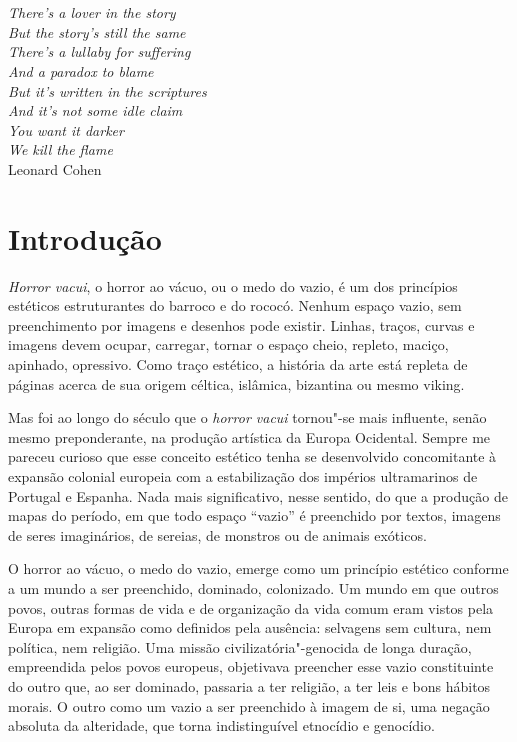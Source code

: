 
\chapter*{}
\thispagestyle{empty}
\begin{vplace}[30]
\begin{flushright}
\emph{There's a lover in the story\\
But the story's still the same\\
There's a lullaby for suffering\\
And a paradox to blame\\
But it's written in the scriptures\\
And it's not some idle claim\\
You want it darker\\
We kill the flame}\\[5pt]
Leonard Cohen 
\end{flushright}
\end{vplace}

\chapter{Introdução}


\emph{Horror vacui}, o horror ao vácuo, ou o medo do vazio, é um dos
princípios estéticos estruturantes do barroco e do rococó. Nenhum espaço
vazio, sem preenchimento por imagens e desenhos pode existir. Linhas,
traços, curvas e imagens devem ocupar, carregar, tornar o espaço cheio,
repleto, maciço, apinhado, opressivo. Como traço estético, a história da
arte está repleta de páginas acerca de sua origem céltica, islâmica,
bizantina ou mesmo viking.

Mas foi ao longo do século  que o \emph{horror vacui} tornou"-se mais
influente, senão mesmo preponderante, na produção artística da Europa
Ocidental. Sempre me pareceu curioso que esse conceito estético tenha se
desenvolvido concomitante à expansão colonial europeia com a
estabilização dos impérios ultramarinos de Portugal e Espanha. Nada mais
significativo, nesse sentido, do que a produção de mapas do período, em
que todo espaço ``vazio'' é preenchido por textos, imagens de seres
imaginários, de sereias, de monstros ou de animais exóticos.

O horror ao vácuo, o medo do vazio, emerge como um princípio estético
conforme a um mundo a ser preenchido, dominado, colonizado. Um mundo em
que outros povos, outras formas de vida e de organização da vida comum
eram vistos pela Europa em expansão como definidos pela ausência:
selvagens sem cultura, nem política, nem religião. Uma missão
civilizatória"-genocida de longa duração, empreendida pelos povos
europeus, objetivava preencher esse vazio constituinte do outro que, ao
ser dominado, passaria a ter religião, a ter leis e bons hábitos morais.
O outro como um vazio a ser preenchido à imagem de si, uma negação
absoluta da alteridade, que torna indistinguível etnocídio e genocídio.

